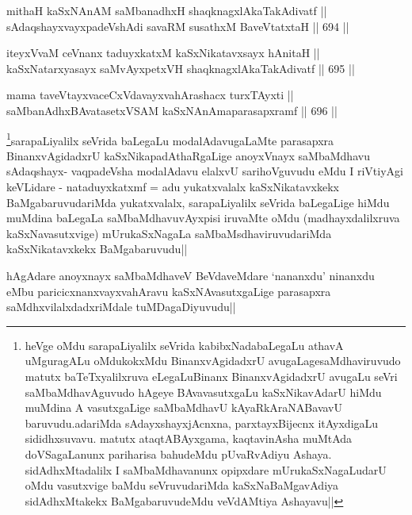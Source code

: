 
\begin{shl}
mithaH kaSxNAnAM saMbanadhxH shaqknagxlAkaTakAdivatf ||  \\
sAdaqshayxvayxpadeVshAdi savaRM susathxM BaveVtatxtaH ||  694 ||  
\end{shl}
				
\begin{shl}
iteyxVvaM ceVnanx taduyxkatxM kaSxNikatavxsayx hAnitaH ||  \\
kaSxNatarxyasayx saMvAyxpetxVH shaqknagxlAkaTakAdivatf ||  695 ||  
\end{shl}
				
\begin{shl}
mama taveVtayxvaceCxVdavayxvahArashacx turxTAyxti || \\
saMbanAdhxBAvatasetxVSAM kaSxNAnAmaparasapxramf ||  696 ||  
\end{shl}

\begin{artha}
\footnote{heVge oMdu sarapaLiyalilx seVrida kabibxNadabaLegaLu athavA uMguragALu  oMdukokxMdu BinanxvAgidadxrU avugaLagesaMdhaviruvudo matutx baTeTxyalilxruva eLegaLuBinanx BinanxvAgidadxrU avugaLu seVri saMbaMdhavAguvudo hAgeye BAvavasutxgaLu kaSxNikavAdarU hiMdu muMdina A vasutxgaLige saMbaMdhavU kAyaRkAraNABavavU baruvudu.adariMda sAdayxshayxjAcnxna, parxtayxBijecnx itAyxdigaLu sididhxsuvavu. matutx ataqtABAyxgama, kaqtavinAsha muMtAda doVSagaLanunx pariharisa bahudeMdu pUvaRvAdiyu Ashaya. sidAdhxMtadalilx I saMbaMdhavanunx opipxdare mUrukaSxNagaLudarU oMdu vasutxvige  baMdu seVruvudariMda kaSxNaBaMgavAdiya sidAdhxMtakekx BaMgabaruvudeMdu veVdAMtiya Ashayavu||}sarapaLiyalilx seVrida baLegaLu modalAdavugaLaMte parasapxra BinanxvAgidadxrU kaSxNikapadAthaRgaLige anoyxVnayx saMbaMdhavu sAdaqshayx- vaqpadeVsha modalAdavu elalxvU sarihoVguvudu eMdu I riVtiyAgi keVLidare - nataduyxkatxmf = adu yukatxvalalx kaSxNikatavxkekx BaMgabaruvudariMda yukatxvalalx, sarapaLiyalilx seVrida baLegaLige hiMdu muMdina baLegaLa saMbaMdhavuvAyxpisi iruvaMte oMdu (madhayxdalilxruva kaSxNavasutxvige) mUrukaSxNagaLa saMbaMsdhaviruvudariMda kaSxNikatavxkekx BaMgabaruvudu||
\end{artha}

\begin{artha}
hAgAdare anoyxnayx saMbaMdhaveV BeVdaveMdare `nananxdu' ninanxdu eMbu paricicxnanxvayxvahAravu kaSxNAvasutxgaLige parasapxra saMdhxvilalxdadxriMdale tuMDagaDiyuvudu||
\end{artha}

